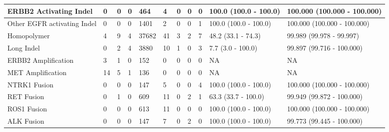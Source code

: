 \begin{tabular}{|l|l|l|l|l|l|l|l|l|l|l|}
ERBB2 Activating Indel      &      0 &      0 &      0 &    464 &      4 &      0 &      0 &      0 &  100.0 (100.0 - 100.0) &  100.000 (100.000 - 100.000) \\ \hline
Other EGFR activating Indel &      0 &      0 &      0 &   1401 &      2 &      0 &      0 &      1 &  100.0 (100.0 - 100.0) &  100.000 (100.000 - 100.000) \\ \hline
Homopolymer                 &      4 &      9 &      4 &  37682 &     41 &      3 &      2 &      7 &     48.2 (33.1 - 74.3) &     99.989 (99.978 - 99.997) \\ \hline
Long Indel                  &      0 &      2 &      4 &   3880 &     10 &      1 &      0 &      3 &      7.7 (3.0 - 100.0) &    99.897 (99.716 - 100.000) \\ \hline
ERBB2 Amplification         &      3 &      1 &      0 &    152 &      0 &      0 &      0 &      0 &                     NA &                           NA \\ \hline
MET Amplification           &     14 &      5 &      1 &    136 &      0 &      0 &      0 &      0 &                     NA &                           NA \\ \hline
NTRK1 Fusion                &      0 &      0 &      0 &    147 &      5 &      0 &      0 &      4 &  100.0 (100.0 - 100.0) &  100.000 (100.000 - 100.000) \\ \hline
RET Fusion                  &      0 &      1 &      0 &    609 &     11 &      0 &      2 &      1 &    63.3 (33.7 - 100.0) &    99.949 (99.872 - 100.000) \\ \hline
ROS1 Fusion                 &      0 &      0 &      0 &    613 &     11 &      0 &      0 &      0 &  100.0 (100.0 - 100.0) &  100.000 (100.000 - 100.000) \\ \hline
ALK Fusion                  &      0 &      0 &      0 &    147 &      7 &      0 &      2 &      0 &  100.0 (100.0 - 100.0) &    99.773 (99.445 - 100.000) \\ \hline
\end{tabular}